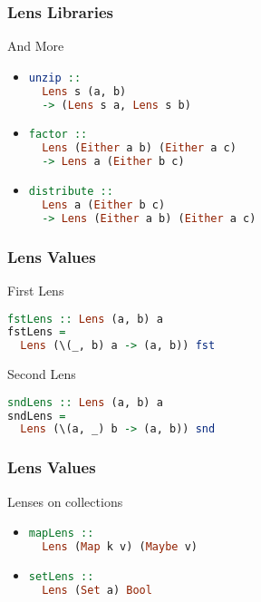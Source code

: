 \begin{frame}[fragile]
\frametitle{Lens Libraries}

\begin{block}{And More}
\begin{itemize}
\item \begin{lstlisting}[language=haskell]
unzip ::
  Lens s (a, b)
  -> (Lens s a, Lens s b)
\end{lstlisting}

\item \begin{lstlisting}[language=haskell]
factor ::
  Lens (Either a b) (Either a c)
  -> Lens a (Either b c)
\end{lstlisting}

\item \begin{lstlisting}[language=haskell]
distribute ::
  Lens a (Either b c)
  -> Lens (Either a b) (Either a c)
\end{lstlisting}
\end{itemize}
\end{block}

\end{frame}

\begin{frame}[fragile]
\frametitle{Lens Values}

\begin{block}{First Lens}
\begin{lstlisting}[language=haskell]
fstLens :: Lens (a, b) a
fstLens =
  Lens (\(_, b) a -> (a, b)) fst
\end{lstlisting}
\end{block}
\begin{block}{Second Lens}
\begin{lstlisting}[language=haskell]
sndLens :: Lens (a, b) a
sndLens =
  Lens (\(a, _) b -> (a, b)) snd
\end{lstlisting}
\end{block}

\end{frame}

\begin{frame}[fragile]
\frametitle{Lens Values}

\begin{block}{Lenses on collections}
\begin{itemize}
\item \begin{lstlisting}[language=haskell]
mapLens ::
  Lens (Map k v) (Maybe v)
\end{lstlisting}

\item \begin{lstlisting}[language=haskell]
setLens ::
  Lens (Set a) Bool
\end{lstlisting}
\end{itemize}
\end{block}

\end{frame}

